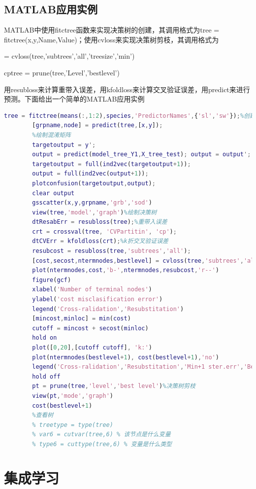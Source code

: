     \subsection{MATLAB应用实例}
        \par
        MATLAB中使用fitctree函数来实现决策树的创建，其调用格式为tree = fitctree(x,y,Name,Value)；使用cvloss来实现决策树剪枝，其调用格式为
        \par
        [~,~,~bestlevel] = cvloss(tree,'subtrees','all','treesize','min')
        \par
        cptree = prune(tree,'Level','bestlevel')
        \par
        用resubloss来计算重带入误差，用kfoldloss来计算交叉验证误差，用predict来进行预测。下面给出一个简单的MATLAB应用实例
        \begin{lstlisting}[language = Matlab]
        tree = fitctree(means(:,1:2),species,'PredictorNames',{'sl','sw'});%创建决策树
        [grpname,node] = predict(tree,[x,y]);
        %绘制混淆矩阵
        targetoutput = y';
        output = predict(model_tree_Y1,X_tree_test); output = output';
        targetoutput = full(ind2vec(targetoutput+1));
        output = full(ind2vec(output+1));
        plotconfusion(targetoutput,output);
        clear output
        gsscatter(x,y,grpname,'grb','sod')
        view(tree,'model','graph')%绘制决策树
        dtResabErr = resubloss(tree);%重带入误差
        crt = crossval(tree, 'CVPartitin', 'cp');
        dtCVErr = kfoldloss(crt);%k折交叉验证误差
        resubcost = resubloss(tree,'subtrees','all');
        [cost,secost,ntermnodes,bestlevel] = cvloss(tree,'subtrees','all')%计算最优level
        plot(ntermnodes,cost,'b-',ntermnodes,resubcost,'r--')
        figure(gcf)
        xlabel('Number of terminal nodes')
        ylabel('cost misclasification error')
        legend('Cross-ralidation','Resubstitation')
        [mincost,minloc] = min(cost)
        cutoff = mincost + secost(minloc)
        hold on
        plot([0,20],[cutoff cutoff], 'k:')
        plot(ntermnodes(bestlevel+1), cost(bestlevel+1),'no')
        legend('Cross-ralidation','Resubstitation','Min+1 ster.err','Best cloice')
        hold off
        pt = prune(tree,'level','best level')%决策树剪枝
        view(pt,'mode','graph')
        cost(bestlevel+1)
        %查看树
        % treetype = type(tree)
        % var6 = cutvar(tree,6) % 该节点是什么变量
        % type6 = cuttype(tree,6) % 变量是什么类型
        \end{lstlisting}

\section{集成学习}
